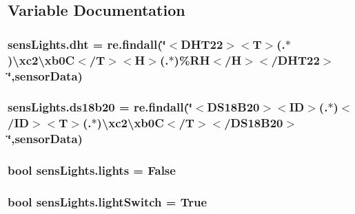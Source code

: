 \subsection{Variable Documentation}
\subsubsection[{\texorpdfstring{dht}{dht}}]{\setlength{\rightskip}{0pt plus 5cm}sens\+Lights.\+dht = re.\+findall(\char`\"{}$<$D\+H\+T22$>$$<$T$>$(.$\ast$)\textbackslash{}xc2\textbackslash{}xb0C$<$/T$>$$<$H$>$(.$\ast$)\%RH$<$/H$>$$<$/{\bf D\+H\+T22}$>$\char`\"{},sensor\+Data)}\hypertarget{namespacesensLights_a332e8e9c0d25bdce1ada40499576e97d}{}\label{namespacesensLights_a332e8e9c0d25bdce1ada40499576e97d}
\subsubsection[{\texorpdfstring{ds18b20}{ds18b20}}]{\setlength{\rightskip}{0pt plus 5cm}sens\+Lights.\+ds18b20 = re.\+findall(\char`\"{}$<$D\+S18\+B20$>$$<$ID$>$(.$\ast$)$<$/ID$>$$<$T$>$(.$\ast$)\textbackslash{}xc2\textbackslash{}xb0C$<$/T$>$$<$/{\bf D\+S18\+B20}$>$\char`\"{},sensor\+Data)}\hypertarget{namespacesensLights_ac8aa58ba0e3b1d1e5e43af8368d84bde}{}\label{namespacesensLights_ac8aa58ba0e3b1d1e5e43af8368d84bde}
\subsubsection[{\texorpdfstring{lights}{lights}}]{\setlength{\rightskip}{0pt plus 5cm}bool sens\+Lights.\+lights = False}\hypertarget{namespacesensLights_a5c2a6a5aad94452fb16ef2b595eade73}{}\label{namespacesensLights_a5c2a6a5aad94452fb16ef2b595eade73}
\subsubsection[{\texorpdfstring{light\+Switch}{lightSwitch}}]{\setlength{\rightskip}{0pt plus 5cm}bool sens\+Lights.\+light\+Switch = True}\hypertarget{namespacesensLights_a8c334ce46f2ca382615e30ca82fa7a2c}{}\label{namespacesensLights_a8c334ce46f2ca382615e30ca82fa7a2c}
